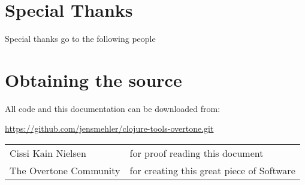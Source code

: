 \chapter{Special Thanks}
Special thanks go to the following people

\chapter{Obtaining the source}
All code and this documentation can be downloaded from:

\url{https://github.com/jensmehler/clojure-tools-overtone.git}

\begin{tabular}{l l}
Cissi Kain Nielsen & for proof reading this document\\
The Overtone Community & for creating this great piece of Software\\
\end{tabular}
